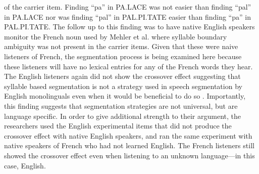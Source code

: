 of the carrier item. Finding “pa” in PA.LACE was not easier than finding “pal” in PA.LACE nor was finding “pal” in PAL.PI.TATE easier than finding “pa” in PAL.PI.TATE. The follow up to this finding was to have native English speakers monitor the French noun used by Mehler et al. \parencite*{Mehler1981-vi} where syllable boundary ambiguity was not present in the carrier items. Given that these were naive listeners of French, the segmentation process is being examined here because these listeners will have no lexical entries for any of the French words they hear. The English listeners again did not show the crossover effect suggesting that syllable based segmentation is not a strategy used in speech segmentation by English monolinguals even when it would be beneficial to do so \parencite{Cutler1986-zl}. Importantly, this finding suggests that segmentation strategies are not universal, but are language specific. In order to give additional strength to their argument, the researchers used the English experimental items that did not produce the crossover effect with native English speakers, and ran the same experiment with native speakers of French who had not learned English. The French listeners still showed the crossover effect even when listening to an unknown language—in this case, English. 
